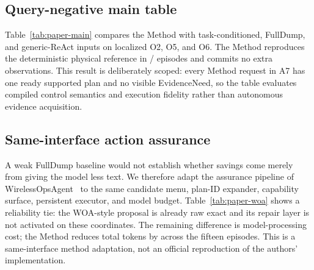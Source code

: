 \documentclass[journal,10pt]{IEEEtran}
\begin{document}
\subsection{Query-negative main table}
Table~\ref{tab:paper-main} compares the Method with task-conditioned, FullDump, and generic-ReAct
inputs on localized O2, O5, and O6. The Method reproduces the deterministic physical reference in
\AgenticMainPhysicalExactEpisodes/\AgenticMainMethodEpisodes{} episodes and commits no extra
observations. This result is deliberately scoped: every Method request in A7 has one ready
supported plan and no visible EvidenceNeed, so the table evaluates compiled control semantics and
execution fidelity rather than autonomous evidence acquisition.
\begin{table}[t]
\centering\small
\caption{Five-seed query-negative live-model main table. Effect exact is measured against the
frozen candidate/reference semantics; physical exact compares the final simulator trajectory.}
\label{tab:paper-main}
\resizebox{\textwidth}{!}{}
\end{table}

\subsection{Same-interface action assurance}
A weak FullDump baseline would not establish whether savings come merely from giving the model
less text. We therefore adapt the assurance pipeline of WirelessOpsAgent~\cite{lu2026wirelessops}
to the same candidate menu, plan-ID expander, capability surface, persistent executor, and model
budget. Table~\ref{tab:paper-woa} shows a reliability tie: the WOA-style proposal is already raw
exact and its repair layer is not activated on these coordinates. The remaining difference is
model-processing cost; the Method reduces total tokens by
\AgenticWOATokenReductionOverall{} across the fifteen episodes. This is a same-interface method
adaptation, not an official reproduction of the authors' implementation.
\begin{table}[t]
\centering\small
\caption{Same-interface WirelessOpsAgent-style comparison.}
\label{tab:paper-woa}
\resizebox{\columnwidth}{!}{}
\end{table}
\end{document}
